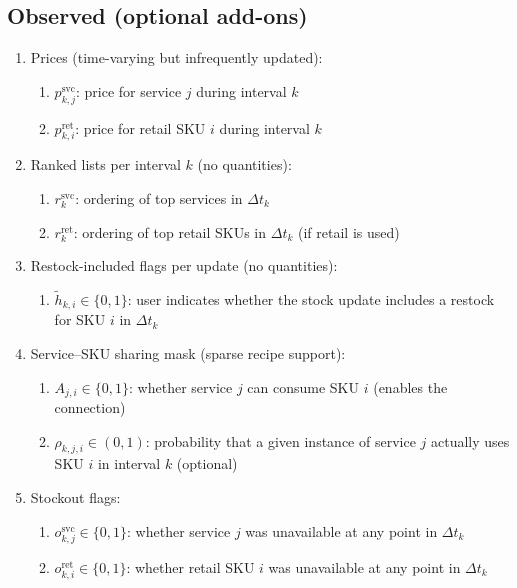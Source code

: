 \documentclass[11pt]{article}
\begin{document}
\subsection*{Observed (optional add-ons)}
\begin{enumerate}
  \item Prices (time-varying but infrequently updated):
  \begin{enumerate}
    \item $p^{\mathrm{svc}}_{k,j}$: price for service $j$ during interval $k$
    \item $p^{\mathrm{ret}}_{k,i}$: price for retail SKU $i$ during interval $k$
  \end{enumerate}

  \item Ranked lists per interval $k$ (no quantities):
  \begin{enumerate}
    \item $r^{\mathrm{svc}}_k$: ordering of top services in $\Delta t_k$
    \item $r^{\mathrm{ret}}_k$: ordering of top retail SKUs in $\Delta t_k$ (if retail is used)
  \end{enumerate}

  \item Restock-included flags per update (no quantities):
  \begin{enumerate}
    \item $\tilde{h}_{k,i} \in \{0,1\}$: user indicates whether the stock update includes a restock for SKU $i$ in $\Delta t_k$
  \end{enumerate}

  \item Service--SKU sharing mask (sparse recipe support):
  \begin{enumerate}
    \item $A_{j,i} \in \{0,1\}$: whether service $j$ can consume SKU $i$ (enables the connection)
    \item $\rho_{k,j,i} \in (0,1)$: probability that a given instance of service $j$ actually uses SKU $i$ in interval $k$ (optional)
  \end{enumerate}

  \item Stockout flags:
  \begin{enumerate}
    \item $o^{\mathrm{svc}}_{k,j} \in \{0,1\}$: whether service $j$ was unavailable at any point in $\Delta t_k$
    \item $o^{\mathrm{ret}}_{k,i} \in \{0,1\}$: whether retail SKU $i$ was unavailable at any point in $\Delta t_k$
  \end{enumerate}
\end{enumerate}
\end{document}
